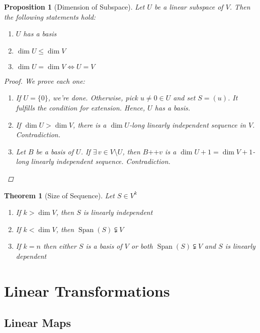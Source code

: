 \documentclass[12pt]{article}
\let\LR\Leftrightarrow
\DeclareMathOperator{\Span}{Span}
\DeclareMathOperator{\concat}{++}
\newtheorem{theorem}{Theorem}[subsection]
\newtheorem{proposition}{Proposition}[subsection]
\begin{document}
\begin{proposition}[Dimension of Subspace]
  Let $U$ be a linear subspace of $V$. Then the following statements hold:
  \begin{enumerate}
    \item $U$ has a basis
    \item $\dim U\leq \dim V$
    \item $\dim U = \dim V \LR U=V$
  \end{enumerate}
  \begin{proof}
    We prove each one:
    \begin{enumerate}
      \item If $U=\{0\}$, we're done. Otherwise, pick $u\neq 0\in U$ and set $S=(u)$. It fulfills the condition for extension. Hence, $U$ has a basis.
      \item If $\dim U >\dim V$, there is a $\dim U$-long linearly independent sequence in $V$. Contradiction.
      \item Let $B$ be a basis of $U$. If $\exists\,v\in V\setminus U$, then $B\concat v$ is a $\dim U+1=\dim V+1$-long linearly independent sequence. Contradiction.
    \end{enumerate}
  \end{proof}
\end{proposition}

\pagebreak

\begin{theorem}[Size of Sequence]
  Let $S\in V^k$
  \begin{enumerate}
    \item If $k>\dim V$, then $S$ is linearly independent
    \item If $k<\dim V$, then $\Span(S)\subsetneqq V$
    \item If $k=n$ then either $S$ is a basis of $V$ or both $\Span(S)\subsetneqq V$ and $S$ is linearly dependent
  \end{enumerate}
\end{theorem}

\pagebreak

\section{Linear Transformations}

\subsection{Linear Maps}
\end{document}
